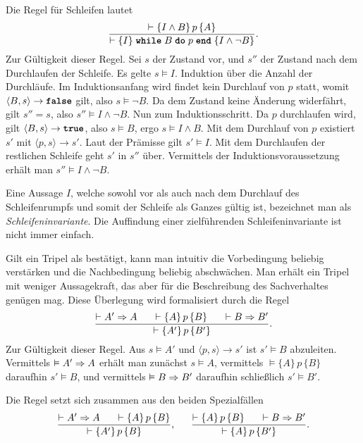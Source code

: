 Die Regel für Schleifen lautet
\[\dfrac{\vdash\{I\land B\}\,p\,\{A\}}
{\vdash\{I\}\;\kw{while}\;B\;\kw{do}\;p\;\kw{end}\;\{I\land\lnot B\}}.\]
Zur Gültigkeit dieser Regel. Sei $s$ der Zustand vor, und $s''$
der Zustand nach dem Durchlaufen der Schleife. Es gelte $s\models I$.
Induktion über die Anzahl der Durchläufe. Im Induktionsanfang wird findet
kein Durchlauf von  $p$ statt, womit $\langle B,s\rangle\to\kw{false}$
gilt, also $s\models\lnot B$. Da dem Zustand keine Änderung widerfährt,
gilt $s''=s$, also $s''\models I\land\lnot B$.
Nun zum Induktionsschritt. Da $p$ durchlaufen wird, gilt
$\langle B,s\rangle\to\kw{true}$, also $s\models B$,
ergo $s\models I\land B$. Mit dem Durchlauf von $p$ existiert
$s'$ mit $\langle p,s\rangle\to s'$. Laut der Prämisse gilt
$s'\models I$. Mit dem Durchlaufen der restlichen Schleife geht $s'$
in $s''$ über. Vermittels der Induktionsvoraussetzung erhält man
$s''\models I\land\lnot B$.

Eine Aussage $I$, welche sowohl vor als auch nach dem Durchlauf des
Schleifenrumpfs und somit der Schleife als Ganzes gültig ist, bezeichnet
man als \emph{Schleifeninvariante}. Die Auffindung einer zielführenden
Schleifeninvariante ist nicht immer einfach.

Gilt ein Tripel als bestätigt, kann man intuitiv die Vorbedingung beliebig
verstärken und die Nachbedingung beliebig abschwächen. Man erhält ein
Tripel mit weniger Aussagekraft, das aber für die Beschreibung des
Sachverhaltes genügen mag. Diese Überlegung wird formalisiert durch
die Regel
\[\dfrac{\vdash A'\Rightarrow A\quad\;\;\vdash\{A\}\,p\,\{B\}\quad\;\;\vdash B\Rightarrow B'}
{\vdash\{A'\}\,p\,\{B'\}}.\]
Zur Gültigkeit dieser Regel. Aus $s\models A'$ und
$\langle p,s\rangle\to s'$ ist $s'\models B$ abzuleiten.
Vermittels $\vDash A'\Rightarrow A$ erhält man zunächst $s\models A$,
vermittels $\models\{A\}\,p\,\{B\}$ daraufhin $s'\models B$,
und vermittels $\vDash B\Rightarrow B'$ daraufhin schließlich $s'\models B'$.

Die Regel setzt sich zusammen aus den beiden Spezialfällen
\[\dfrac{\vdash A'\Rightarrow A\quad\;\;\vdash\{A\}\,p\,\{B\}}
{\vdash\{A'\}\,p\,\{B\}},\quad\;\;
\dfrac{\vdash\{A\}\,p\,\{B\}\quad\;\;\vdash B\Rightarrow B'}
{\vdash\{A\}\,p\,\{B'\}}.\]

